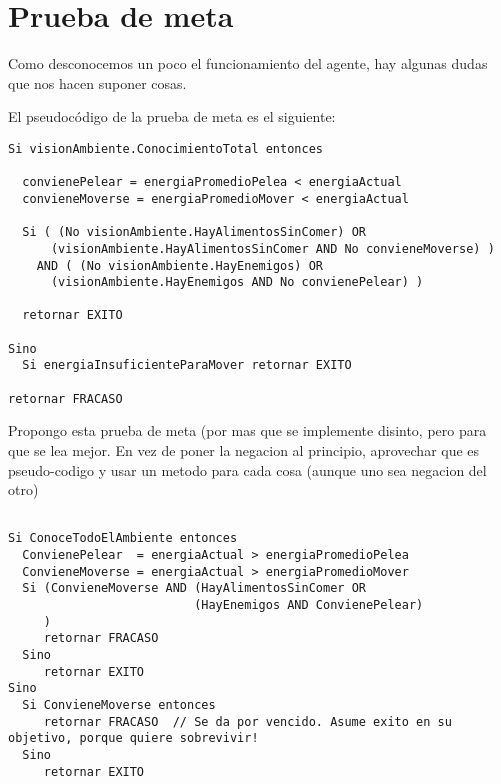 \section{Prueba de meta}

Como desconocemos un poco el funcionamiento del agente, hay algunas dudas que
nos hacen suponer cosas.

El pseudocódigo de la prueba de meta es el siguiente:

\begin{verbatim}
Si visionAmbiente.ConocimientoTotal entonces

  convienePelear = energiaPromedioPelea < energiaActual
  convieneMoverse = energiaPromedioMover < energiaActual

  Si ( (No visionAmbiente.HayAlimentosSinComer) OR
      (visionAmbiente.HayAlimentosSinComer AND No convieneMoverse) )
    AND ( (No visionAmbiente.HayEnemigos) OR
      (visionAmbiente.HayEnemigos AND No convienePelear) )

  retornar EXITO

Sino
  Si energiaInsuficienteParaMover retornar EXITO

retornar FRACASO
\end{verbatim}

Propongo esta prueba de meta (por mas que se implemente disinto, pero para que se lea mejor. En vez de poner la negacion al principio, aprovechar que es pseudo-codigo y usar un metodo para cada cosa (aunque uno sea negacion del otro)
\begin{verbatim}

Si ConoceTodoElAmbiente entonces
  ConvienePelear  = energiaActual > energiaPromedioPelea
  ConvieneMoverse = energiaActual > energiaPromedioMover
  Si (ConvieneMoverse AND (HayAlimentosSinComer OR 
                          (HayEnemigos AND ConvienePelear) 
     )  
     retornar FRACASO
  Sino
     retornar EXITO
Sino
  Si ConvieneMoverse entonces
     retornar FRACASO  // Se da por vencido. Asume exito en su objetivo, porque quiere sobrevivir!
  Sino
     retornar EXITO

\end{verbatim}

